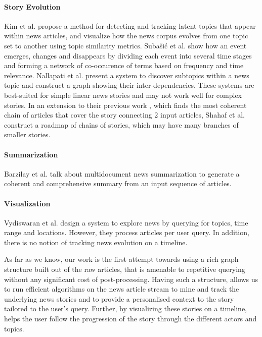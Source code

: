 \paragraph*{Story Evolution}  Kim et al.\cite{Kim:2011:TCU:1964750.1964765} propose a method for detecting and tracking latent topics that appear within news articles, and visualize how the news corpus evolves from one topic set to another using topic similarity metrics. Suba\v{s}i\'{c} et al.\cite{subasic-ida:2013} %
 show how an event emerges, changes and disappears by dividing each event into several time stages and forming a network of co-occurence of terms based on frequency and time relevance. Nallapati et al.\cite
{Nallapati:2004:ETW:1031171.1031258, Mei:2005:DET:1081870.1081895} present a system to discover subtopics within a news topic and construct a graph showing their inter-dependencies. These systems are best-suited for simple linear news stories and may not work well for complex stories. In an extension to their previous work \cite{shahaf@kdd2010}, which finds the most coherent chain of articles that cover the story connecting 2 input articles, Shahaf et al.\cite{shahaf@www2012} construct a roadmap of chains of stories, which may have many branches of smaller stories. 

\paragraph*{Summarization} Barzilay et al.\cite{Barzilay:2002:ISS:1622810.1622812} talk about multidocument news summarization to generate a coherent and comprehensive summary from an input sequence of articles.

\paragraph*{Visualization} Vydiswaran et al.\cite{MEET:MEET14504801078} design a system to explore news by querying for topics, time range and locations. However, they process articles per user query. In addition, there is no notion of tracking news evolution on a timeline.

As far as we know, our work is the first attempt towards using a rich graph structure built out of the raw articles, that is amenable to repetitive querying without any significant cost of post-processing. Having such a structure, allows us to run efficient algorithms on the news article stream to mine and track the underlying news stories and to provide a personalised context to the story tailored to the user's query. Further, by visualizing these stories on a timeline, helps the user follow the progression of the story through the different actors and topics.
